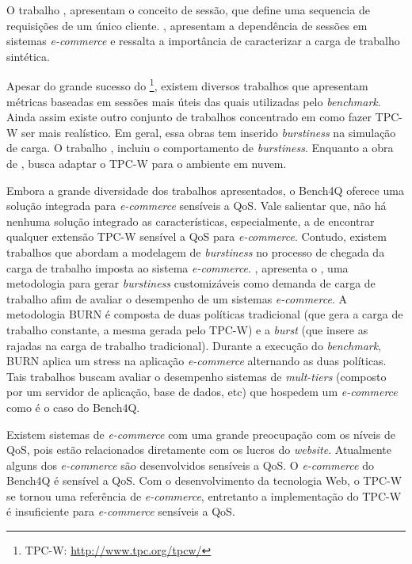 O trabalho , apresentam o conceito de sessão, que define uma sequencia de requisições de um único cliente. , apresentam a dependência de sessões em sistemas \textit{e-commerce} e ressalta a importância de caracterizar a carga de trabalho sintética.

Apesar do grande sucesso do  \footnote{TPC-W: \url{http://www.tpc.org/tpcw/}}, existem diversos trabalhos que apresentam métricas baseadas em sessões mais úteis das quais utilizadas pelo \textit{benchmark}. Ainda assim existe outro conjunto de trabalhos concentrado em como fazer TPC-W ser mais realístico. Em geral, essa obras tem inserido \textit{burstiness} na simulação de carga. O trabalho , incluiu o comportamento de \textit{burstiness}. Enquanto a obra de , busca adaptar o TPC-W para o ambiente em nuvem.

Embora a grande diversidade dos trabalhos apresentados, o Bench4Q oferece uma solução integrada para \textit{e-commerce} sensíveis a QoS. Vale salientar que, não há nenhuma solução integrado as características, especialmente, a de encontrar qualquer extensão TPC-W sensível a QoS para \textit{e-commerce}. Contudo, existem trabalhos que abordam a modelagem de \textit{burstiness} no processo de chegada da carga de trabalho imposta ao sistema \textit{e-commerce}. , apresenta o , uma metodologia para gerar \textit{burstiness} customizáveis como demanda de carga de trabalho afim de avaliar o desempenho de um sistemas \textit{e-commerce}. A metodologia BURN é composta de duas políticas tradicional (que gera a carga de trabalho constante, a mesma gerada pelo TPC-W) e a \textit{burst} (que insere as rajadas na carga de trabalho tradicional). Durante a execução do \textit{benchmark}, BURN aplica um stress na aplicação \textit{e-commerce} alternando as duas políticas. Tais trabalhos buscam avaliar o desempenho sistemas de \textit{mult-tiers} (composto por um servidor de aplicação, base de dados, etc) que hospedem um \textit{e-commerce} como é o caso do Bench4Q.


Existem sistemas de \textit{e-commerce} com uma grande preocupação com os níveis de QoS, pois estão relacionados diretamente com os lucros do \textit{website}. Atualmente alguns dos \textit{e-commerce} são desenvolvidos sensíveis a QoS. O \textit{e-commerce} do Bench4Q é sensível a QoS.  Com o desenvolvimento da tecnologia Web, o TPC-W se tornou uma referência de \textit{e-commerce}, entretanto a implementação do TPC-W é insuficiente para \textit{e-commerce} sensíveis a QoS.

